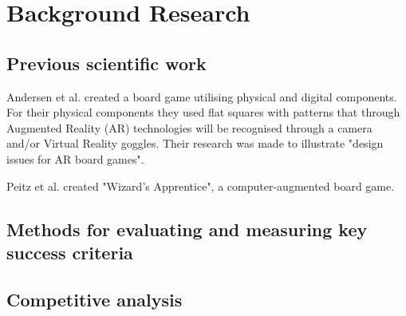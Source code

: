 \chapter{Background Research}\label{ch:bgres}

\section{Previous scientific work}
Andersen et al. \citep{andersen_designing_2004} created a board game utilising physical and digital components. For their physical components they used flat squares with patterns that through Augmented Reality (AR) technologies will be recognised through a camera and/or Virtual Reality goggles. Their research was made to illustrate "design issues for AR board games".

Peitz et al. created "Wizard's Apprentice", a computer-augmented board game. 

\section{Methods for evaluating and measuring key success criteria}


\section{Competitive analysis}
